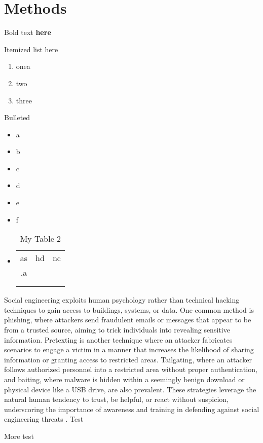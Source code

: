 \chapter{Methods\label{methods}}

Bold text \textbf{here}



Itemized list here

\begin{enumerate}
    \item one\rightarrow a
    \item two
    \item three
\end{enumerate}

Bulleted
\begin{itemize}
    \item a
    \item b
    \item c
    \item d
    \item e
    \item f
    \item 

\begin{table}
    \centering
    \begin{tabular}{ccc}
         as&  hd& nc\\
         ,a&  & \\
         &  & \\
         &  & \\
    \end{tabular}
    \caption{My Table 2}
    \label{tab:my_label}
\end{table}
\end{itemize}

Social engineering exploits human psychology rather than technical hacking techniques to gain access to buildings, systems, or data. One common method is phishing, where attackers send fraudulent emails or messages that appear to be from a trusted source, aiming to trick individuals into revealing sensitive information. Pretexting is another technique where an attacker fabricates scenarios to engage a victim in a manner that increases the likelihood of sharing information or granting access to restricted areas. Tailgating, where an attacker follows authorized personnel into a restricted area without proper authentication, and baiting, where malware is hidden within a seemingly benign download or physical device like a USB drive, are also prevalent. These strategies leverage the natural human tendency to trust, be helpful, or react without suspicion, underscoring the importance of awareness and training in defending against social engineering threats \citep{neupane_social_2018}.
Test

More test

